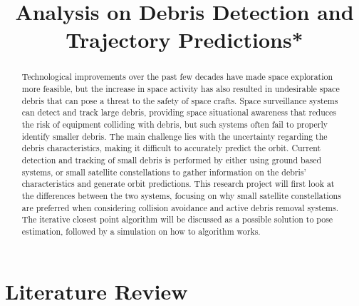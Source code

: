 \documentclass[conference]{IEEEtran}
\begin{document}
	
	\title{Analysis on Debris Detection and Trajectory Predictions*}

	\author{
	}

	\maketitle
	
	\begin{abstract}
		
		Technological improvements over the past few decades have made space exploration more feasible, but the increase in space activity has also resulted in undesirable space debris that can pose a threat to the safety of space crafts. 
		Space surveillance systems can detect and track large debris, providing space situational awareness that reduces the risk of equipment colliding with debris, but such systems often fail to properly identify smaller debris. The main challenge lies with the uncertainty regarding the debris characteristics, making it difficult to accurately predict the orbit.
		Current detection and tracking of small debris is performed by either using ground based systems, or small satellite constellations to gather information on the debris' characteristics and generate orbit predictions.
		This research project will first look at the differences between the two systems, focusing on why small satellite constellations are preferred when considering collision avoidance and active debris removal systems. The iterative closest point algorithm will be discussed as a possible solution to pose estimation, followed by a simulation on how to algorithm works.

	\end{abstract}

	\section{Literature Review}
	
\end{document}
